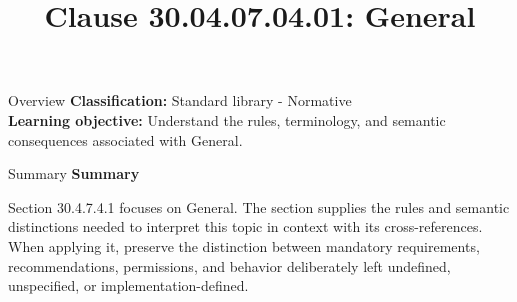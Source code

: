 \documentclass[10pt,letterpaper]{article}
\title{Clause 30.04.07.04.01: General}
\author{}
\date{}
\begin{document}
\maketitle
\begin{CornellOverviewBox}{Overview}
\textbf{Classification:} Standard library - Normative\\[2pt]
\textbf{Learning objective:} Understand the rules, terminology, and semantic consequences associated with General.
\end{CornellOverviewBox}\begin{CornellSummaryBox}{Summary}
{\sffamily\bfseries\color{Accent} Summary}\par\vspace{3pt}Section 30.4.7.4.1 focuses on General. The section supplies the rules and semantic distinctions needed to interpret this topic in context with its cross-references. When applying it, preserve the distinction between mandatory requirements, recommendations, permissions, and behavior deliberately left undefined, unspecified, or implementation-defined.
\end{CornellSummaryBox}
\end{document}
